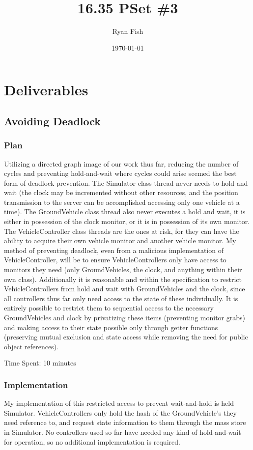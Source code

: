 \documentclass{article}
\title{16.35 PSet \#3}
\author{Ryan Fish}
\date{\today}
\begin{document}
\maketitle

\section{Deliverables}
\subsection{Avoiding Deadlock}
\subsubsection{Plan}
Utilizing a directed graph image of our work thus far, reducing the number of cycles and preventing hold-and-wait where cycles could arise seemed the best form of deadlock prevention.  The Simulator class thread never needs to hold and wait (the clock may be incremented without other resources, and the position transmission to the server can be accomplished accessing only one vehicle at a time).  The GroundVehicle class thread also never executes a hold and wait, it is either in possession of the clock monitor, or it is in possession of its own monitor.  The VehicleController class threads are the ones at risk, for they can have the ability to acquire their own vehicle monitor and another vehicle monitor.  My method of preventing deadlock, even from a malicious implementation of VehicleController, will be to ensure VehicleControllers only have access to monitors they need (only GroundVehicles, the clock, and anything within their own class).  Additionally it is reasonable and within the specification to restrict VehicleControllers from hold and wait with GroundVehicles and the clock, since all controllers thus far only need access to the state of these individually. It is entirely possible to restrict them to sequential access to the necessary GroundVehicles and clock by privatizing these items (preventing monitor grabs) and making access to their state possible only through getter functions (preserving mutual exclusion and state access while removing the need for public object references).

Time Spent: 10 minutes

\subsubsection{Implementation}
My implementation of this restricted access to prevent wait-and-hold is held Simulator.  VehicleControllers only hold the hash of the GroundVehicle's they need reference to, and request state information to them through the mass store in Simulator.  No controllers used so far have needed any kind of hold-and-wait for operation, so no additional implementation is required.
\end{document}

